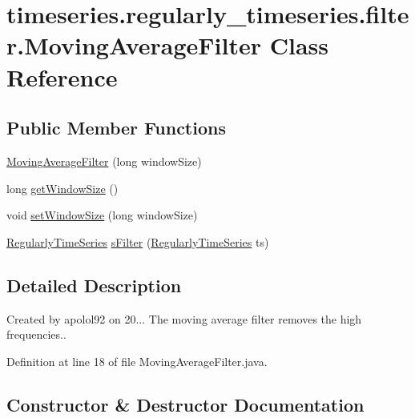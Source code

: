\hypertarget{classtimeseries_1_1regularly__timeseries_1_1filter_1_1_moving_average_filter}{}\section{timeseries.\+regularly\+\_\+timeseries.\+filter.\+Moving\+Average\+Filter Class Reference}
\label{classtimeseries_1_1regularly__timeseries_1_1filter_1_1_moving_average_filter}
\subsection*{Public Member Functions}
\begin{DoxyCompactItemize}
\item 
\hyperlink{classtimeseries_1_1regularly__timeseries_1_1filter_1_1_moving_average_filter_aefadc5f9c5bab347e68b5d12dbc1ed6b}{Moving\+Average\+Filter} (long window\+Size)
\item 
long \hyperlink{classtimeseries_1_1regularly__timeseries_1_1filter_1_1_moving_average_filter_af3831216f494edd6413b4321d5522099}{get\+Window\+Size} ()
\item 
void \hyperlink{classtimeseries_1_1regularly__timeseries_1_1filter_1_1_moving_average_filter_aa01ecc19644d3329eef2fd720fa7dc63}{set\+Window\+Size} (long window\+Size)
\item 
\hyperlink{classtimeseries_1_1_regularly_time_series}{Regularly\+Time\+Series} \hyperlink{classtimeseries_1_1regularly__timeseries_1_1filter_1_1_moving_average_filter_a56443c8a9dbe1dc225fb1696d2fd000b}{s\+Filter} (\hyperlink{classtimeseries_1_1_regularly_time_series}{Regularly\+Time\+Series} ts)
\end{DoxyCompactItemize}


\subsection{Detailed Description}
Created by apolol92 on 20... The moving average filter removes the high frequencies.. 

Definition at line 18 of file Moving\+Average\+Filter.\+java.



\subsection{Constructor \& Destructor Documentation}
\hypertarget{classtimeseries_1_1regularly__timeseries_1_1filter_1_1_moving_average_filter_aefadc5f9c5bab347e68b5d12dbc1ed6b}{}
